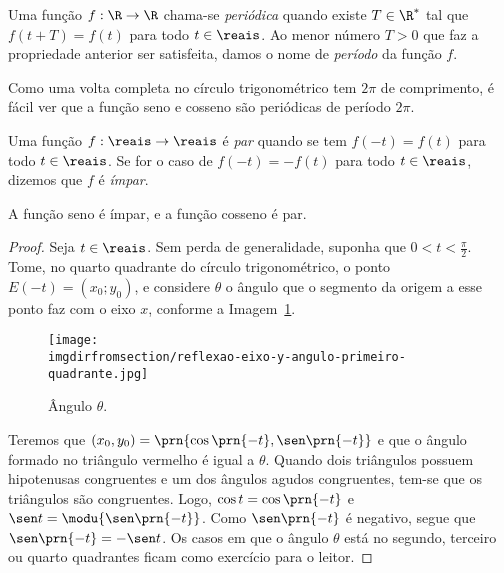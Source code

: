\begin{definition}
\label{def:funcao-periodica}
	Uma função $f: \R \to \R$ chama-se \emph{periódica} quando existe $T
\in \R^\ast$ tal que $f(t + T) = f(t)$ para todo $t \in \reais$. Ao
menor número $T>0$ que faz a propriedade anterior ser satisfeita,
damos o nome de \emph{período} da função $f$.
\end{definition}

\begin{remark}
	Como uma volta completa no círculo trigonométrico tem $2 \pi$ de
comprimento, é fácil ver que a função seno e cosseno são periódicas
de período $2\pi$.
\end{remark}

\begin{definition}
\label{def:funcao-par-impar}
	Uma função $f: \reais \to \reais$ é \emph{par} quando se tem $f(-t) = f(t)$
para todo $t\in \reais$. Se for o caso de $f(-t) = - f(t)$ para todo $t
\in \reais$, dizemos que $f$ é \emph{ímpar}.
\end{definition}

 \begin{proposition}
	 A função seno é ímpar, e a função cosseno é par.
 \end{proposition}

\begin{proof}
	Seja $t \in \reais$. Sem perda de generalidade, suponha que $0 < t < \frac \pi 2$.
	Tome, no quarto quadrante do círculo trigonométrico, o ponto $E(-t) = (x_0; y_0)$, e considere 
	$\theta$ o ângulo que o segmento da origem a esse ponto faz com o eixo $x$, conforme a Imagem~\ref{img:reflexao-eixo-y-angulo-primeiro-quadrante}.
	\begin{figure}[H]
		\centering
		\texttt{[image: \\imgdirfromsection/reflexao-eixo-y-angulo-primeiro-quadrante.jpg]}
		\caption{Ângulo $\theta$.}
		\label{img:reflexao-eixo-y-angulo-primeiro-quadrante}
	\end{figure}
	Teremos que $(x_0, y_0) =\prn{\cos\prn{-t}, \sen\prn{-t}}$ e que o ângulo formado no triângulo vermelho é igual a $\theta$.
	Quando dois triângulos possuem hipotenusas congruentes e um dos ângulos agudos congruentes, tem-se que os triângulos são congruentes.
	Logo, $\cos t = \cos\prn{-t}$ e $\sen t = \modu{\sen\prn{- t}}$. Como $\sen\prn{-t}$ é negativo, segue que 
	$\sen\prn{-t} = -\sen t$. Os casos em que o ângulo $\theta$ está no segundo, terceiro ou quarto quadrantes ficam como exercício 
	para o leitor.
\end{proof}

